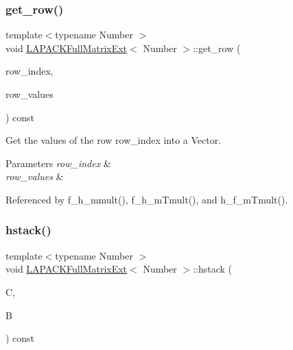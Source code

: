 \subsubsection{\texorpdfstring{get\+\_\+row()}{get\_row()}}
{\footnotesize\ttfamily template$<$typename Number $>$ \\
void \hyperlink{classLAPACKFullMatrixExt}{L\+A\+P\+A\+C\+K\+Full\+Matrix\+Ext}$<$ Number $>$\+::get\+\_\+row (\begin{DoxyParamCaption}\item[{const \hyperlink{classLAPACKFullMatrixExt_a5cf5f4a6104dc17029210b5ca52bf574}{size\+\_\+type}}]{row\+\_\+index,  }\item[{Vector$<$ Number $>$ \&}]{row\+\_\+values }\end{DoxyParamCaption}) const}

Get the values of the row {\ttfamily row\+\_\+index} into a {\ttfamily Vector}. 
\begin{DoxyParams}{Parameters}
{\em row\+\_\+index} & \\
\hline
{\em row\+\_\+values} & \\
\hline
\end{DoxyParams}


Referenced by f\+\_\+h\+\_\+mmult(), f\+\_\+h\+\_\+m\+Tmult(), and h\+\_\+f\+\_\+m\+Tmult().

\mbox{\label{classLAPACKFullMatrixExt_aeeae2d2698007889a47f192043adb75c}} 
\subsubsection{\texorpdfstring{hstack()}{hstack()}}
{\footnotesize\ttfamily template$<$typename Number $>$ \\
void \hyperlink{classLAPACKFullMatrixExt}{L\+A\+P\+A\+C\+K\+Full\+Matrix\+Ext}$<$ Number $>$\+::hstack (\begin{DoxyParamCaption}\item[{\hyperlink{classLAPACKFullMatrixExt}{L\+A\+P\+A\+C\+K\+Full\+Matrix\+Ext}$<$ Number $>$ \&}]{C,  }\item[{const \hyperlink{classLAPACKFullMatrixExt}{L\+A\+P\+A\+C\+K\+Full\+Matrix\+Ext}$<$ Number $>$ \&}]{B }\end{DoxyParamCaption}) const}

